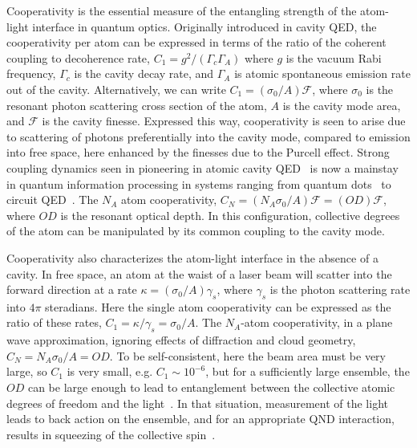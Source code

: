 \documentclass[aps,pra,twocolumn,superscriptaddress]{revtex4-1} %
\begin{document}
Cooperativity is the essential measure of the entangling strength of the atom-light interface in quantum optics.  Originally introduced in cavity QED, the cooperativity per atom can be expressed in terms of the ratio of the coherent coupling to decoherence rate, $C_1 = g^2/(\Gamma_c \Gamma_A)$ where $g$ is the vacuum Rabi frequency,  $\Gamma_c$ is the cavity decay rate, and $\Gamma_A$ is atomic spontaneous emission rate out of the cavity.  Alternatively, we can write $C_1 = (\sigma_0/A) \mathcal{F}$, where $\sigma_0$ is the resonant photon scattering cross section of the atom, $A$ is the cavity mode area, and $\mathcal{F}$ is the cavity finesse.  Expressed this way, cooperativity is seen to arise due to scattering of photons preferentially into the cavity mode, compared to emission into free space, here enhanced by the finesses due to the Purcell effect. Strong coupling dynamics seen in pioneering in atomic cavity QED~\cite{Aoki2006,Miller2005} is now a mainstay in quantum information processing in systems ranging from quantum dots~\cite{Akimov2007,Akopian2006,Liu2010} to circuit QED~\cite{Wallraff2004Strong,Vlastakis2013,Tosi2014}.  The $N_A$ atom cooperativity, $C_N = (N_A \sigma_0/A) \mathcal{F} =( OD) \mathcal{F}$, where $OD$ is the resonant optical depth.  In this configuration, collective degrees of the atom can be manipulated by its common coupling to the cavity mode.

Cooperativity also characterizes the atom-light interface in the absence of a cavity.  In free space, an atom at the waist of a laser beam will scatter into the forward direction at a rate $\kappa = (\sigma_0/A) \gamma_s$, where $\gamma_s$ is the photon scattering rate into $4 \pi$ steradians.  Here the single atom cooperativity can be expressed as the ratio of these rates, $C_1 = \kappa/\gamma_s = \sigma_0/A$.  The $N_A$-atom cooperativity, in a plane wave approximation, ignoring effects of diffraction and cloud geometry, $C_N = N_A \sigma_0/A = OD$.  To be self-consistent, here the beam area must be very large, so $C_1$ is very small, e.g. $C_1 \sim 10^{-6}$, but for a sufficiently large ensemble, the $OD$ can be large enough to lead to entanglement between the collective atomic degrees of freedom and the light~\cite{Kuzmich1998,Takahashi1999Quantum}.  In that situation, measurement of the light leads to back action on the ensemble, and for an appropriate QND interaction, results in squeezing of the collective spin~\cite{Madsen2004Spin,Kuzmich2000}.
\end{document}
